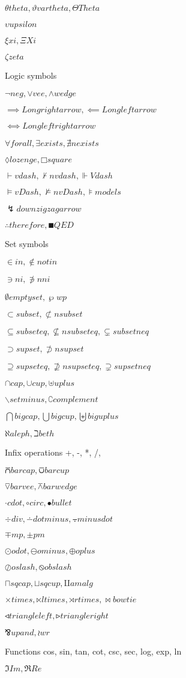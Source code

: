 \documentclass{article}
\begin{document}
$θ theta, ϑ vartheta, Θ Theta$

$υ upsilon$

$ξ xi, Ξ Xi$

$ζ zeta$

Logic symbols

$¬ neg, ∨ vee, ∧ wedge$

$⟹ Longrightarrow, ⟸ Longleftarrow$

$⟺ Longleftrightarrow$

$∀ forall, ∃ exists, ∄ nexists$

$◊ lozenge, □ square$

$⊢ vdash, ⊬ nvdash, ⊩ Vdash$

$⊨ vDash, ⊭ nvDash, ⊧ models$

$↯ downzigzagarrow$

$∴ therefore, ∎ QED$

Set symbols

$∈ in, ∉ notin$

$∋ ni, ∌ nni$

$∅ emptyset, ℘ wp$

$⊂ subset, ⊄ nsubset$

$⊆ subseteq, ⊈ nsubseteq, ⊊ subsetneq$

$⊃ supset, ⊅ nsupset$

$⊇ supseteq, ⊉ nsupseteq, ⊋ supsetneq$

$∩ cap, ∪ cup, ⊎ uplus$

$∖ setminus, ∁ complement$

$⋂ bigcap, ⋃ bigcup, ⨄ biguplus$

$ℵ aleph, ℶ beth$

Infix operations +, -, *, /, %

$⩃ barcap, ⩂ barcup$

$⊽ barvee, ⊼ barwedge$

$⋅ cdot, ∘ circ, • bullet$

$÷ div, ∸ dotminus, ⨪ minusdot$

$∓ mp, ± pm$

$⊙ odot, ⊖ ominus, ⊕ oplus$

$⊘ oslash, ⦸ obslash$

$⊓ sqcap, ⊔ sqcup, ⨿ amalg$

$× times, ⋉ ltimes, ⋊ rtimes, ⋈ bowtie$

$◃ triangleleft, ▹ triangleright$

$⅋ upand, ≀ wr$

Functions cos, sin, tan, cot, csc, sec, log, exp, ln

$ℑ Im, ℜ Re$
\end{document}
